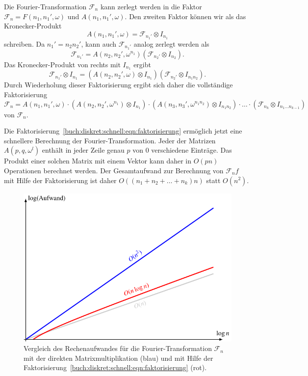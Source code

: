 Die Fourier-Transformation $\mathscr{F}_n$ kann zerlegt werden in die
Faktor $\mathscr{F}_n=F(n_1,n_1',\omega)$ und $A(n_1,n_1',\omega)$.
Den zweiten Faktor können wir als das Kronecker-Produkt
\[
A(n_1,n_1',\omega)
=
\mathscr{F}_{n_1'} \otimes I_{n_1}
\]
schreiben.
Da $n_1'=n_2n_2'$, kann auch $\mathscr{F}_{n_1'}$ analog zerlegt werden
als
\[
\mathscr{F}_{n_1'}
=
A(n_2,n_2',\omega^{n_1}) (\mathscr{F}_{n_2'}\otimes I_{n_2}).
\]
Das Kronecker-Produkt von rechts mit $I_{n_1}$ ergibt
\[
\mathscr{F}_{n_1'}\otimes I_{n_1}
=
(A(n_2,n_2',\omega)\otimes I_{n_1})
(\mathscr{F}_{n_2'}\otimes I_{n_1n_2}).
\]
Durch Wiederholung dieser Faktorisierung ergibt sich daher die
vollständige Faktorisierung
\begin{equation}
\mathscr{F}_n
=
A(n_1,n_1',\omega)
\cdot
(A(n_2,n_2',\omega^{n_1})\otimes I_{n_1})
\cdot
(A(n_3,n_3',\omega^{n_1n_2})\otimes I_{n_1n_2})
\cdot
\ldots
\cdot
(\mathscr{F}_{n_k}\otimes I_{n_1\dots n_{k-1}})
\label{buch:diskret:schnell:eqn:faktorisierung}
\end{equation}
von $\mathscr{F}_n$.

Die Faktorisierung~\eqref{buch:diskret:schnell:eqn:faktorisierung}
ermöglich jetzt eine schnellere Berechnung der Fourier-Transformation.
Jeder der Matrizen $A(p,q,\omega^l)$ enthält in jeder Zeile genau
$p$ von $0$ verschiedene Einträge.
Das Produkt einer solchen Matrix mit einem Vektor kann daher in 
$O(pn)$ Operationen berechnet werden.
Der Gesamtaufwand zur Berechnung von $\mathscr{F}_nf$ mit Hilfe
der Faktorisierung ist daher 
\(
O((n_1+n_2+\dots+n_k)n)
\)
statt $O(n^2)$.

\begin{figure}
\centering
\includegraphics{chapters/060-diskret/images/log.pdf}
\caption{Vergleich des Rechenaufwandes für die Fourier-Transformation
$\mathscr{F}_n$ mit der direkten Matrixmultiplikation (blau) und
mit Hilfe der 
Faktorisierung~\eqref{buch:diskret:schnell:eqn:faktorisierung}
(rot).
\label{buch:diskret:schnell:fig:log}}
\end{figure}%

